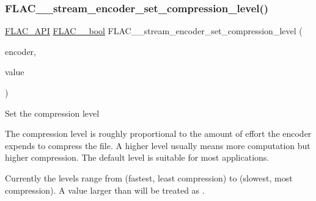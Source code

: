 \subsubsection{\texorpdfstring{F\+L\+A\+C\+\_\+\+\_\+stream\+\_\+encoder\+\_\+set\+\_\+compression\+\_\+level()}{FLAC\_\_stream\_encoder\_set\_compression\_level()}}
{\footnotesize\ttfamily \hyperlink{group__flac__export_ga56ca07df8a23310707732b1c0007d6f5}{F\+L\+A\+C\+\_\+\+A\+PI} \hyperlink{ordinals_8h_a95103469f1cbd78b8cf250194985b34e}{F\+L\+A\+C\+\_\+\+\_\+bool} F\+L\+A\+C\+\_\+\+\_\+stream\+\_\+encoder\+\_\+set\+\_\+compression\+\_\+level (\begin{DoxyParamCaption}\item[{\hyperlink{struct_f_l_a_c_____stream_encoder}{F\+L\+A\+C\+\_\+\+\_\+\+Stream\+Encoder} $\ast$}]{encoder,  }\item[{unsigned}]{value }\end{DoxyParamCaption})}

Set the compression level

The compression level is roughly proportional to the amount of effort the encoder expends to compress the file. A higher level usually means more computation but higher compression. The default level is suitable for most applications.

Currently the levels range from {} (fastest, least compression) to {} (slowest, most compression). A value larger than {} will be treated as {}.

